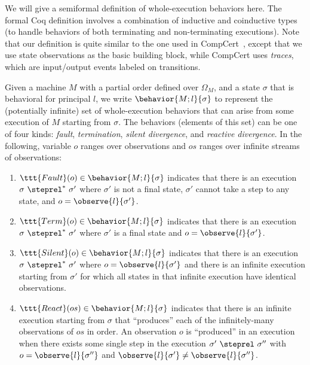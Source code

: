 We will give a semiformal definition of whole-execution behaviors here. 
The formal Coq definition involves a
combination of inductive and coinductive types (to handle behaviors of
both terminating and non-terminating executions). Note that our 
definition is quite similar to the one used in CompCert~\cite{Leroy-backend},
except that we use state observations as the basic building block, while 
CompCert uses \emph{traces}, which are input/output events labeled on 
transitions.
\begin{definition}
Given a machine $M$ with a partial order defined over $\Omega_M$,
and a state $\sigma$ that is behavioral for 
principal $l$, we write $\behavior{M;l}{\sigma}$ to represent the (potentially 
infinite) set of whole-execution behaviors that can arise from some execution 
of $M$ starting from $\sigma$. The behaviors (elements of this set) can 
be one of four kinds: \emph{fault}, \emph{termination}, \emph{silent divergence},
and \emph{reactive divergence}. In the following, variable $o$ ranges over 
observations and $os$ ranges over infinite streams of observations:
\begin{enumerate}
\item $\ttt{Fault}(o) \in \behavior{M;l}{\sigma}$ indicates that there
is an execution $\sigma~\steprel^*~\sigma'$ where $\sigma'$ is not
a final state, $\sigma'$ cannot take a step to any state, and 
$o = \observe{l}{\sigma'}$.
\item $\ttt{Term}(o) \in \behavior{M;l}{\sigma}$ indicates that there
is an execution $\sigma~\steprel^*~\sigma'$ where $\sigma'$ is 
a final state and $o = \observe{l}{\sigma'}$.
\item $\ttt{Silent}(o) \in \behavior{M;l}{\sigma}$ indicates that there
is an execution $\sigma~\steprel^*~\sigma'$ where $o = \observe{l}{\sigma'}$
and there is an infinite execution starting from $\sigma'$ for which all
states in that infinite execution have identical observations.
\item $\ttt{React}(os) \in \behavior{M;l}{\sigma}$ indicates that there
is an infinite execution starting from $\sigma$ that ``produces'' each of the
infinitely-many observations of $os$ in order. An observation $o$ is ``produced'' 
in an execution when there exists some single step in the execution 
$\sigma'~\steprel~\sigma''$ with $o = \observe{l}{\sigma''}$ and 
$\observe{l}{\sigma'} \neq \observe{l}{\sigma''}$.
\end{enumerate}
\end{definition}

